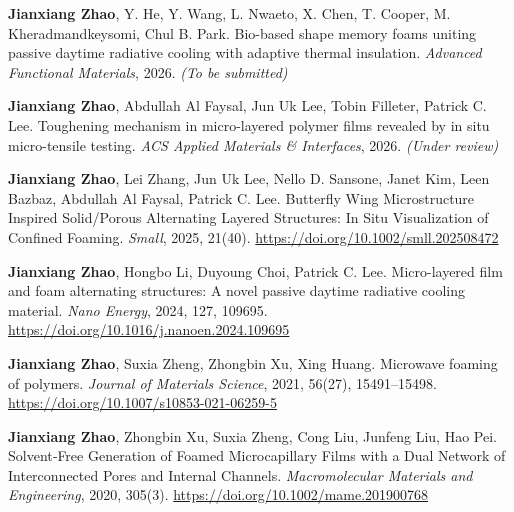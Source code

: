 
\begin{pubcounter}
\item \textbf{Jianxiang Zhao}, Y. He, Y. Wang, L. Nwaeto, X. Chen, T. Cooper, M. Kheradmandkeysomi, Chul B. Park. Bio-based shape memory foams uniting passive daytime radiative cooling with adaptive thermal insulation. \textit{Advanced Functional Materials}, 2026. \textit{(To be submitted)}
\item \textbf{Jianxiang Zhao}, Abdullah Al Faysal, Jun Uk Lee, Tobin Filleter, Patrick C. Lee. Toughening mechanism in micro-layered polymer films revealed by in situ micro-tensile testing. \textit{ACS Applied Materials \& Interfaces}, 2026. \textit{(Under review)}
\item \textbf{Jianxiang Zhao}, Lei Zhang, Jun Uk Lee, Nello D. Sansone, Janet Kim, Leen Bazbaz, Abdullah Al Faysal, Patrick C. Lee. Butterfly Wing Microstructure Inspired Solid/Porous Alternating Layered Structures: In Situ Visualization of Confined Foaming. \textit{Small}, 2025, 21(40). \url{https://doi.org/10.1002/smll.202508472}
\item \textbf{Jianxiang Zhao}, Hongbo Li, Duyoung Choi, Patrick C. Lee. Micro-layered film and foam alternating structures: A novel passive daytime radiative cooling material. \textit{Nano Energy}, 2024, 127, 109695. \url{https://doi.org/10.1016/j.nanoen.2024.109695}
\item \textbf{Jianxiang Zhao}, Suxia Zheng, Zhongbin Xu, Xing Huang. Microwave foaming of polymers. \textit{Journal of Materials Science}, 2021, 56(27), 15491--15498. \url{https://doi.org/10.1007/s10853-021-06259-5}
\item \textbf{Jianxiang Zhao}, Zhongbin Xu, Suxia Zheng, Cong Liu, Junfeng Liu, Hao Pei. Solvent‐Free Generation of Foamed Microcapillary Films with a Dual Network of Interconnected Pores and Internal Channels. \textit{Macromolecular Materials and Engineering}, 2020, 305(3). \url{https://doi.org/10.1002/mame.201900768}
\end{pubcounter}

